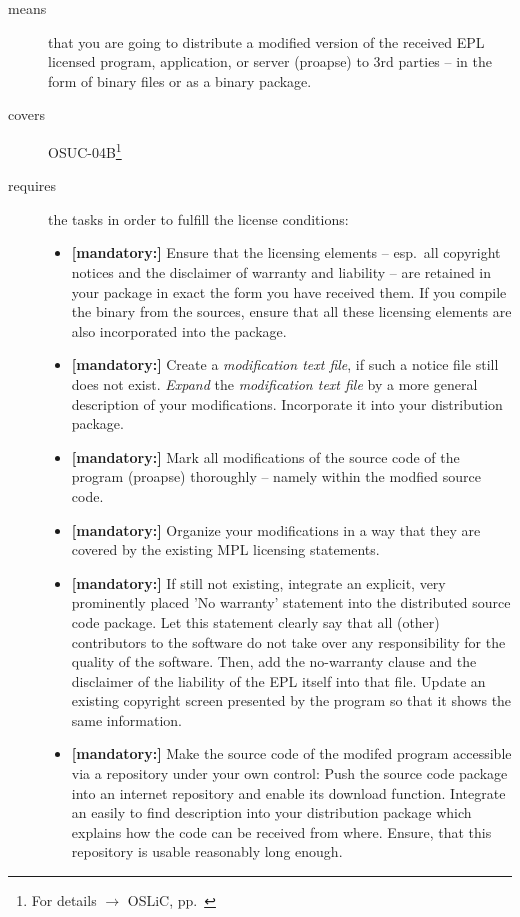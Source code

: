 \begin{description}
\item[means] that you are going to distribute a modified version of the received
EPL licensed pro\-gram, application, or server (proapse) to 3rd parties -- in
the form of binary files or as a binary package.
\item[covers] OSUC-04B\footnote{For details $\rightarrow$ OSLiC, pp.\
\pageref{OSUC-04B-DEF}}
\item[requires] the tasks in order to fulfill the license conditions:
\begin{itemize}

  \item \textbf{[mandatory:]} Ensure that the licensing elements -- esp.\ all
  copyright notices and the disclaimer of warranty and liability -- are retained
  in your package in exact the form you have received them. If you compile the
  binary from the sources, ensure that all these licensing elements are also
  incorporated into the package.

  \item \textbf{[mandatory:]} Create a \emph{modification text file}, if such a
  notice file still does not exist. \emph{Expand} the \emph{modification text
  file} by a more general description of your modifications. Incorporate it into
  your distribution package.

  \item \textbf{[mandatory:]} Mark all modifications of the source code of the
  program (proapse) thoroughly -- namely within the
  modfied source code.
  
  \item \textbf{[mandatory:]} Organize your modifications in a way that they are
  covered by the existing MPL licensing statements.

  \item \textbf{[mandatory:]} If still not existing, integrate an explicit, very
  prominently placed 'No warranty' statement into the distributed source code
  package. Let this statement clearly say that all (other) contributors to the
  software do not take over any responsibility for the quality of the software.
  Then, add the no-warranty clause and the disclaimer of the liability of the
  EPL itself into that file. Update an existing copyright screen presented by
  the program so that it shows the same information.

  \item \textbf{[mandatory:]} Make the source code of the modifed program
  accessible via a repository under your own control: Push the source code
  package into an internet repository and enable its download function.
  Integrate an easily to find description into your distribution package which
  explains how the code can be received from where. Ensure, that this repository
  is usable reasonably long enough.
  

\end{itemize}
\end{description}
